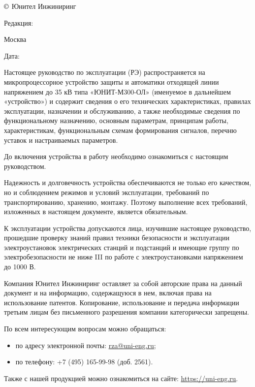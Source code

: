 \pagestyle{fancy}
\fancyhf{}
\renewcommand{\headrulewidth}{1pt}
\lhead{\color{black}{ЮТКБ.656122.609 РЭ2 Редакция \rev~от~\revdate}}
\rfoot{{\thepage}}
\renewcommand{\footrulewidth}{1pt}


\pagecolor{white}

\noindent
$\copyright$ \the\year{} Юнител Инжиниринг
\hfill
\parbox{0.3\textwidth}{\raggedleft Редакция: \textcolor{unigray}{\rev}}

\vskip 3mm
\noindent
Москва
\hfill
\parbox{0.3\textwidth}{\raggedleft Дата: \textcolor{unigray}{\revdate}}
\vskip 8mm

\vskip 10mm

\par
Настоящее руководство по эксплуатации (РЭ) распространяется на микропроцессорное устройство защиты и автоматики отходящей линии напряжением до 35 кВ типа «ЮНИТ-М300-ОЛ» (именуемое в дальнейшем «устройство») и содержит сведения о его технических характеристиках, правилах эксплуатации, назначении и обслуживанию, а также необходимые сведения по функциональному назначению, основным параметрам, принципам работы, характеристикам, функциональным схемам формирования сигналов, перечню уставок и настраиваемых параметров.
\medskip
\par
До включения устройства в работу необходимо ознакомиться с настоящим руководством.
\medskip
\par
Надежность и долговечность устройства обеспечиваются не только его качеством, но и соблюдением режимов и условий эксплуатации, требований по транспортированию, хранению, монтажу. Поэтому выполнение всех требований, изложенных в настоящем документе, является обязательным. 
\medskip
\par
К эксплуатации устройства допускаются лица, изучившие настоящее руководство, прошедшие проверку знаний правил техники безопасности и эксплуатации электроустановок электрических станций и подстанций и имеющие группу по электробезопасности не ниже III по работе с электроустановками напряжением до 1000 В.


\vskip 75mm
\par
Компания Юнител Инжиниринг оставляет за собой авторские права на данный документ и на информацию, содержащуюся в нем, включая права на использование патентов. Копирование, использование и передача информации третьим лицам без письменного разрешения компании категорически запрещены.

\vskip 10mm
\par
По всем интересующим вопросам можно обращаться:
\begin{itemize}
\item по адресу электронной почты: \href{mailto:rza@uni-eng.ru}{\color{uniblue}\uline{rza@uni-eng.ru}};
\item по телефону: +7 (495) 165-99-98 (доб. 2561).
\end{itemize}
Также с нашей продукцией можно ознакомиться на сайте: \href{https://uni-eng.ru}{\color{uniblue}\uline{https://uni-eng.ru}}.

